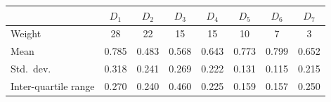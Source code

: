 \begin{tabular}{lccccccc}
\toprule
& $D_1$ & $D_2$ & $D_3$ & $D_4$ & $D_5$ & $D_6$ & $D_7$ \\
\midrule
Weight & 28 & 22 & 15 & 15 & 10 & 7 & 3 \\
Mean & 0.785 & 0.483 & 0.568 & 0.643 & 0.773 & 0.799 & 0.652 \\
Std.\ dev. & 0.318 & 0.241 & 0.269 & 0.222 & 0.131 & 0.115 & 0.215 \\
Inter-quartile range & 0.270 & 0.240 & 0.460 & 0.225 & 0.159 & 0.157 & 0.250 \\
\bottomrule
\end{tabular}
